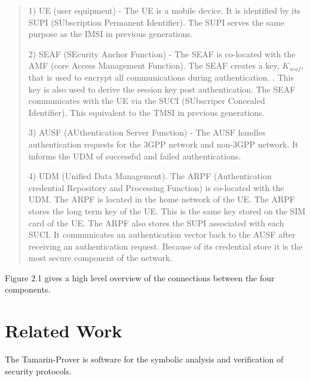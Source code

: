 \documentclass[11pt, pdftex]{article}
\begin{document}
\begin{quote}
1) UE (user equipment) -  The UE is a mobile device.  It is identified by its SUPI (SUbscription Permanent   
Identifier).  The SUPI serves the same purpose as the IMSI in previous generations.

2) SEAF (SEcurity Anchor Function) - The SEAF is co-located with the AMF (core Access Management Function).  The SEAF creates a key, $K_{seaf}$, that is used to encrypt all communications during authentication.  \cite{zhang2017overview}.  This key is also used to derive the session key post authentication.  The SEAF communicates with the UE via the SUCI (SUbscriper Concealed Identifier).  This equivalent to the TMSI in previous generations. 

3) AUSF (AUthentication Server Function) -  The AUSF handles authentication requests for the 3GPP network and non-3GPP network.  It informs the UDM of successful and failed authentications.  

4) UDM (Unified Data Management). The ARPF (Authentication credential Repository and Processing Function) is co-located with the UDM. The ARPF is located in the home network of the UE. The ARPF stores the long term key of the UE.  This is the same key stored on the SIM card of the UE.  The ARPF also stores the SUPI associated with each SUCI.  It communicates an authentication vector back to the AUSF after receiving an authentication request.  Because of its credential store it is the most secure component of the network. \cite{cremers2017comprehensive}

\end{quote}

Figure 2.1 gives a high level overview of the connections between the four components.
\section{Related Work}
The Tamarin-Prover is software for the symbolic analysis and verification of security protocols.



     
\nocite{*}


\end{document}
